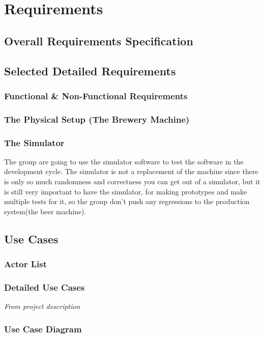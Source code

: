 \section{Requirements}

\subsection{Overall Requirements Specification}

\subsection{Selected Detailed Requirements}

\subsubsection{Functional \& Non-Functional Requirements}

\subsubsection{The Physical Setup (The Brewery Machine)}

\subsubsection{The Simulator}
The group are going to use the simulator software to test the software in the
development cycle.
The simulator is not a replacement of the machine since there is only
so much randomness and correctness you can get out of a simulator, but it is 
still very important to have the simulator, for making prototypes and make 
multiple tests for it, so the group don't push any regressions to the production
system(the beer machine).

\subsection{Use Cases}

\subsubsection{Actor List}

\subsubsection{Detailed Use Cases}
\textit{From project description}

\subsubsection{Use Case Diagram}
